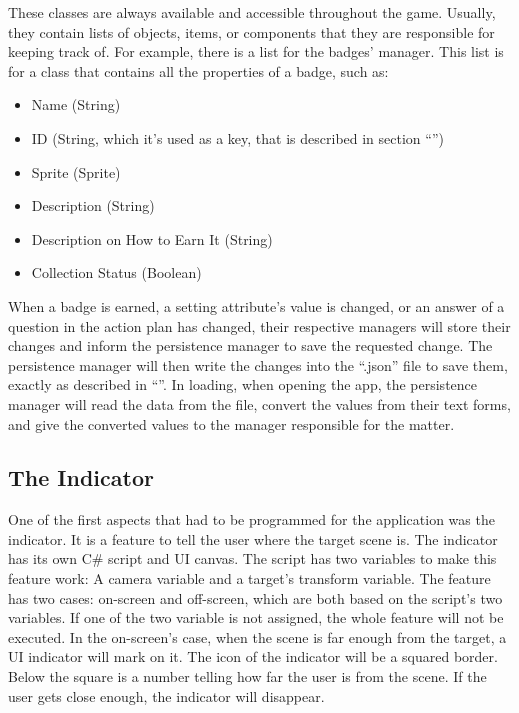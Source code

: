 These classes are always available and accessible throughout the game. Usually, they contain lists of objects, items, or components that they are responsible for keeping track of. For example, there is a list for the badges' manager. This list is for a class that contains all the properties of a badge, such as:
\begin{itemize}
\item{Name (String)}
\item{ID (String, which it's used as a key, that is described in section “\textbf{}”)}
\item{Sprite (Sprite)}
\item{Description (String)}
\item{Description on How to Earn It (String)}
\item{Collection Status (Boolean)}
\end{itemize}

When a badge is earned, a setting attribute's value is changed, or an answer of a question in the action plan has changed, their respective managers will store their changes and inform the persistence manager to save the requested change. The persistence manager will then write the changes into the “.json” file to save them, exactly as described in “\textbf{}”. In loading, when opening the app, the persistence manager will read the data from the file, convert the values from their text forms, and give the converted values to the manager responsible for the matter.

\subsection{The Indicator}
One of the first aspects that had to be programmed for the application was the indicator. It is a feature to tell the user where the target scene is. The indicator has its own C\# script and \acrshort{UI} canvas. The script has two variables to make this feature work: A camera variable and a target's transform variable. The feature has two cases: on-screen and off-screen, which are both based on the script's two variables. If one of the two variable is not assigned, the whole feature will not be executed. In the on-screen's case, when the scene is far enough from the target, a UI indicator will mark on it. The icon of the indicator will be a squared border. Below the square is a number telling how far the user is from the scene. If the user gets close enough, the indicator will disappear.\\

